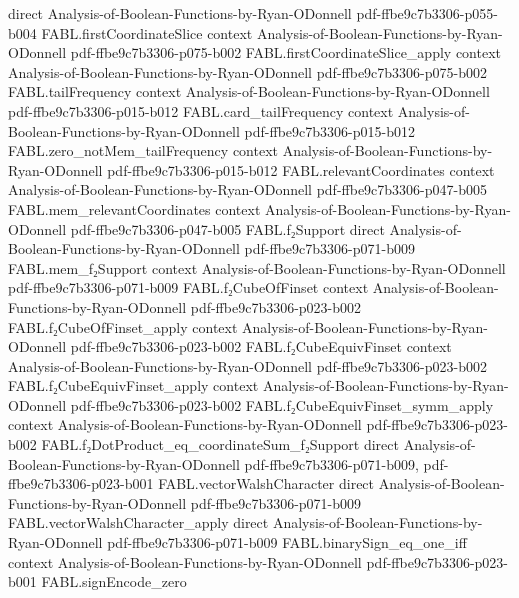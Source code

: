\begin{theorem}
  {direct}
  {Analysis-of-Boolean-Functions-by-Ryan-ODonnell}
  {pdf-ffbe9c7b3306-p055-b004}
\proofstep
  {FABL.firstCoordinateSlice}
  {context}
  {Analysis-of-Boolean-Functions-by-Ryan-ODonnell}
  {pdf-ffbe9c7b3306-p075-b002}
\proofstep
  {FABL.firstCoordinateSlice_apply}
  {context}
  {Analysis-of-Boolean-Functions-by-Ryan-ODonnell}
  {pdf-ffbe9c7b3306-p075-b002}
\proofstep
  {FABL.tailFrequency}
  {context}
  {Analysis-of-Boolean-Functions-by-Ryan-ODonnell}
  {pdf-ffbe9c7b3306-p015-b012}
\proofstep
  {FABL.card_tailFrequency}
  {context}
  {Analysis-of-Boolean-Functions-by-Ryan-ODonnell}
  {pdf-ffbe9c7b3306-p015-b012}
\proofstep
  {FABL.zero_notMem_tailFrequency}
  {context}
  {Analysis-of-Boolean-Functions-by-Ryan-ODonnell}
  {pdf-ffbe9c7b3306-p015-b012}
\proofstep
  {FABL.relevantCoordinates}
  {context}
  {Analysis-of-Boolean-Functions-by-Ryan-ODonnell}
  {pdf-ffbe9c7b3306-p047-b005}
\proofstep
  {FABL.mem_relevantCoordinates}
  {context}
  {Analysis-of-Boolean-Functions-by-Ryan-ODonnell}
  {pdf-ffbe9c7b3306-p047-b005}
\proofstep
  {FABL.f₂Support}
  {direct}
  {Analysis-of-Boolean-Functions-by-Ryan-ODonnell}
  {pdf-ffbe9c7b3306-p071-b009}
\proofstep
  {FABL.mem_f₂Support}
  {context}
  {Analysis-of-Boolean-Functions-by-Ryan-ODonnell}
  {pdf-ffbe9c7b3306-p071-b009}
\proofstep
  {FABL.f₂CubeOfFinset}
  {context}
  {Analysis-of-Boolean-Functions-by-Ryan-ODonnell}
  {pdf-ffbe9c7b3306-p023-b002}
\proofstep
  {FABL.f₂CubeOfFinset_apply}
  {context}
  {Analysis-of-Boolean-Functions-by-Ryan-ODonnell}
  {pdf-ffbe9c7b3306-p023-b002}
\proofstep
  {FABL.f₂CubeEquivFinset}
  {context}
  {Analysis-of-Boolean-Functions-by-Ryan-ODonnell}
  {pdf-ffbe9c7b3306-p023-b002}
\proofstep
  {FABL.f₂CubeEquivFinset_apply}
  {context}
  {Analysis-of-Boolean-Functions-by-Ryan-ODonnell}
  {pdf-ffbe9c7b3306-p023-b002}
\proofstep
  {FABL.f₂CubeEquivFinset_symm_apply}
  {context}
  {Analysis-of-Boolean-Functions-by-Ryan-ODonnell}
  {pdf-ffbe9c7b3306-p023-b002}
\proofstep
  {FABL.f₂DotProduct_eq_coordinateSum_f₂Support}
  {direct}
  {Analysis-of-Boolean-Functions-by-Ryan-ODonnell}
  {pdf-ffbe9c7b3306-p071-b009,
    pdf-ffbe9c7b3306-p023-b001}
\proofstep
  {FABL.vectorWalshCharacter}
  {direct}
  {Analysis-of-Boolean-Functions-by-Ryan-ODonnell}
  {pdf-ffbe9c7b3306-p071-b009}
\proofstep
  {FABL.vectorWalshCharacter_apply}
  {direct}
  {Analysis-of-Boolean-Functions-by-Ryan-ODonnell}
  {pdf-ffbe9c7b3306-p071-b009}
\proofstep
  {FABL.binarySign_eq_one_iff}
  {context}
  {Analysis-of-Boolean-Functions-by-Ryan-ODonnell}
  {pdf-ffbe9c7b3306-p023-b001}
\proofstep
  {FABL.signEncode_zero}

\end{theorem}
